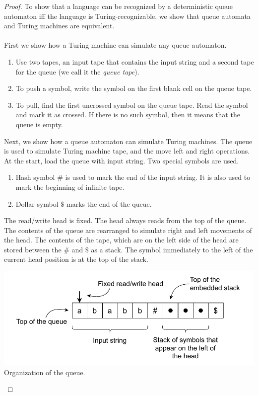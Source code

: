\documentclass[11pt]{article}
\begin{document}
\begin{proof}
To show that a language can be recognized by a deterministic queue automaton iff the language is Turing-recognizable, we show that queue automata and Turing machines are equivalent. \\
\\
First we show how a Turing machine can simulate any queue automaton.
\begin{enumerate}
\item Use two tapes, an input tape that contains the input string and a second tape for the queue (we call it the \textit{queue tape}).
\item To push a symbol, write the symbol on the first blank cell on the queue tape.
\item To pull, find the first uncrossed symbol on the queue tape. Read the symbol and mark it as crossed. If there is no such symbol, then it means that the queue is empty.
\end{enumerate}
Next, we show how a queue automaton can simulate Turing machines. The queue is used to simulate Turing machine tape, and the move left and right operations. At the start, load the queue with input string. Two special symbols are used.
\begin{enumerate}
\item Hash symbol $\#$ is used to mark the end of the input string. It is also used to mark the beginning of infinite tape.
\item Dollar symbol $\$$ marks the end of the queue.
\end{enumerate}

The read/write head is fixed. The head always reads from the top of the queue. The contents of the queue are rearranged to simulate right and left movements of the head. The contents of the tape, which are on the left side of the head are stored between the $\#$ and $\$$ as a stack. The symbol immediately to the left of the current head position is at the top of the stack.

\begin{center}
\includegraphics[scale=0.8]{Figures/Problem3.14a.pdf} \\
Organization of the queue.
\end{center}


\end{proof}
\end{document}
